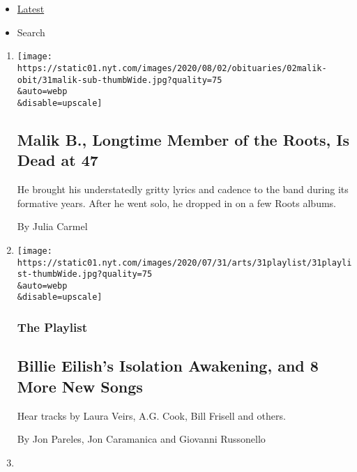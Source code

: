 \begin{itemize}
\tightlist
\item
  \protect\hyperlink{stream-panel}{Latest}
\item
  Search
\end{itemize}

\begin{enumerate}
\def\labelenumi{\arabic{enumi}.}
\item
  \href{/2020/07/31/arts/music/malik-b-dead.html}{}

  \texttt{[image: https://static01.nyt.com/images/2020/08/02/obituaries/02malik-obit/31malik-sub-thumbWide.jpg?quality=75\\\&auto=webp\\\&disable=upscale]}

  \hypertarget{malik-b-longtime-member-of-the-roots-is-dead-at-47}{%
  \subsection{Malik B., Longtime Member of the Roots, Is Dead at
  47}\label{malik-b-longtime-member-of-the-roots-is-dead-at-47}}

  He brought his understatedly gritty lyrics and cadence to the band
  during its formative years. After he went solo, he dropped in on a few
  Roots albums.

  By Julia Carmel
\item
  \href{/2020/07/31/arts/music/playlist-billie-eilish-snakehips-a-boogie.html}{}

  \texttt{[image: https://static01.nyt.com/images/2020/07/31/arts/31playlist/31playlist-thumbWide.jpg?quality=75\\\&auto=webp\\\&disable=upscale]}

  \hypertarget{the-playlist}{%
  \subsubsection{The Playlist}\label{the-playlist}}

  \hypertarget{billie-eilishs-isolation-awakening-and-8-more-new-songs}{%
  \subsection{Billie Eilish's Isolation Awakening, and 8 More New
  Songs}\label{billie-eilishs-isolation-awakening-and-8-more-new-songs}}

  Hear tracks by Laura Veirs, A.G. Cook, Bill Frisell and others.

  By Jon Pareles, Jon Caramanica and Giovanni Russonello
\item
  \href{/article/dominic-fike-at-first.html}{}


\end{enumerate}
